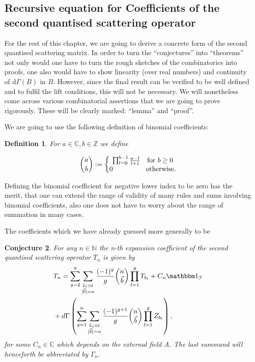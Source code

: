 \documentclass[b5paper,draft,openbib,12pt]{memoir}
\newtheorem{Def}{Definition}[section]
\newtheorem{Conj}[Def]{Conjecture}
\newcommand{\id}{{\mathbbm 1}}
\begin{document}
\subsection{Recursive equation for Coefficients of the second quantised scattering operator}

For the rest of this chapter, we are going to derive a concrete form of the second quantised scattering matrix. In order to turn the ``conjectures'' 
into ``theorems'' not only would one have to turn the rough sketches of the combinatorics into proofs, one also would have to show linearity (over real numbers) and
continuity of \(\mathrm{d}\Gamma(B)\) in \(B\).
However, since the final result can be verified to be well defined and to fulfil the lift conditions, this will not be necessary.
We will nonetheless come across various combinatorial assertions that we are going to prove rigorously. 
These will be clearly marked: ``lemma'' and ``proof''.

We are going to use the following definition of binomial coefficients:
\begin{Def}
For \(a\in\mathbb{C}, b\in\mathbb{Z}\) we define

\begin{equation}
\binom{a}{b} := \left\{\begin{matrix}
\prod_{l=0}^{b-1} \frac{a-l}{l+1} \quad \text{for } b\ge 0\\
0 \hspace{1.7cm} \text{otherwise.}
\end{matrix}\right.
\end{equation}
\end{Def}

Defining the binomial coefficient for negative lower index to be zero has the merit, that one can extend the
range of validity of many rules and sums involving binomial coefficients, also one does not have 
to worry about the range of summation in many cases.



The coefficients which we have already guessed more generally to be

\begin{Conj}\label{thm: T_n recursive}
For any \(n\in\mathbb{N}\) the n-th expansion coefficient of the second quantised scattering operator \(T_n\) is given by
\begin{align}\notag
&T_n = \sum_{g=2}^n \sum_{\stackrel{\vec{b}\in\mathbb{N}^g}{|\vec{b}|=n}}\frac{(-1)^g}{g} 
\binom{n}{\vec{b}} \prod_{l=1}^g T_{b_l} + C_n \id_{\mathcal{F}} \\ \label{T_n recursive}
&+ d\Gamma\left( \sum_{g=1}^n \sum_{\stackrel{\vec{b}\in\mathbb{N}^g}{|\vec{b}|=n}}\frac{(-1)^{g+1}}{g} 
\binom{n}{\vec{b}} \prod_{l=1}^g Z_{b_l}  \right),
\end{align}
for some \(C_n\in \mathbb{C}\) which depends on the external field \(A\). The last summand will henceforth
be abbreviated by \(\Gamma_n\).
\end{Conj}
\end{document}
